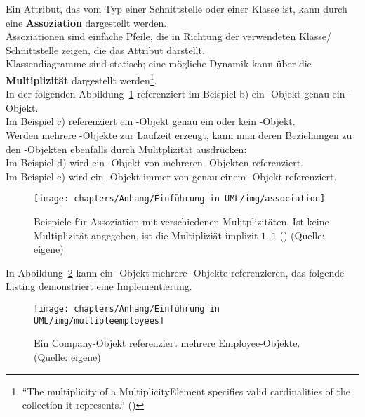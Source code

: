 Ein Attribut, das vom Typ einer Schnittstelle oder einer Klasse ist, kann durch eine \textbf{Assoziation} dargestellt werden.\\

\noindent
Assoziationen sind einfache Pfeile, die in Richtung der verwendeten Klasse/ Schnittstelle zeigen, die das Attribut darstellt.\\

\noindent
Klassendiagramme sind statisch; eine mögliche Dynamik kann über die \textbf{Multiplizität} dargestellt werden\footnote{
    ``The multiplicity of a MultiplicityElement specifies valid cardinalities of the collection it represents.`` (\cite[33]{UML17})
}.\\
In der folgenden Abbildung~\ref{fig:association} referenziert im Beispiel b) ein -Objekt genau ein -Objekt.\\
Im Beispiel c) referenziert ein -Objekt genau ein oder kein -Objekt.\\


\noindent
Werden mehrere -Objekte zur Laufzeit erzeugt, kann man deren Beziehungen zu den -Objekten ebenfalls durch Mulitplizität ausdrücken:\\
\noindent
Im Beispiel d) wird ein -Objekt von mehreren -Objekten referenziert.\\
\noindent
Im Beispiel e) wird ein -Objekt immer von genau einem -Objekt referenziert.

\begin{figure}
    \centering
    \texttt{[image: chapters/Anhang/Einführung in UML/img/association]}
    \caption{Beispiele für Assoziation mit verschiedenen Mulitplizitäten. Ist keine Multiplizität angegeben, ist die Multipliziät implizit $1..1$ (\cite[19]{UML17}) (Quelle: eigene)}
    \label{fig:association}
\end{figure}

\noindent
In Abbildung~\ref{fig:multipleemployees} kann ein -Objekt mehrere -Objekte referenzieren, das folgende Listing demonstriert eine Implementierung.\\

\begin{figure}
    \centering
    \texttt{[image: chapters/Anhang/Einführung in UML/img/multipleemployees]}
    \caption{Ein Company-Objekt referenziert mehrere Employee-Objekte. (Quelle: eigene)}
    \label{fig:multipleemployees}
\end{figure}



